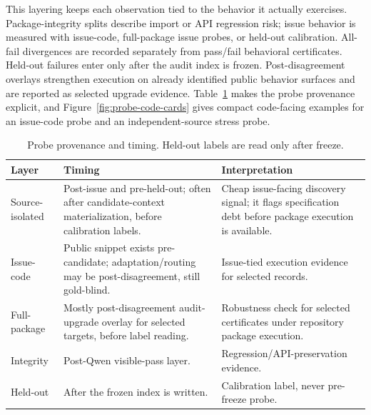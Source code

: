 \documentclass[conference]{IEEEtran}
\begin{document}
This layering keeps each observation tied to the behavior it actually exercises.
Package-integrity splits describe import or API regression risk; issue behavior is measured with issue-code, full-package issue probes, or held-out calibration.
All-fail divergences are recorded separately from pass/fail behavioral certificates.
Held-out failures enter only after the audit index is frozen.
Post-disagreement overlays strengthen execution on already identified public behavior surfaces and are reported as selected upgrade evidence.
Table~\ref{tab:probe-provenance} makes the probe provenance explicit, and Figure~\ref{fig:probe-code-cards} gives compact code-facing examples for an issue-code probe and an independent-source stress probe.

\begin{table}[t]
\caption{Probe provenance and timing. Held-out labels are read only after freeze.}
\label{tab:probe-provenance}
\centering
\scriptsize
\begin{tabularx}{\columnwidth}{lXX}
\toprule
Layer & Timing & Interpretation \\
\midrule
Source-isolated & Post-issue and pre-held-out; often after candidate-context materialization, before calibration labels. & Cheap issue-facing discovery signal; it flags specification debt before package execution is available. \\
Issue-code & Public snippet exists pre-candidate; adaptation/routing may be post-disagreement, still gold-blind. & Issue-tied execution evidence for selected records. \\
Full-package & Mostly post-disagreement audit-upgrade overlay for selected targets, before label reading. & Robustness check for selected certificates under repository package execution. \\
Integrity & Post-Qwen visible-pass layer. & Regression/API-preservation evidence. \\
Held-out & After the frozen index is written. & Calibration label, never pre-freeze probe. \\
\bottomrule
\end{tabularx}
\end{table}
\end{document}
